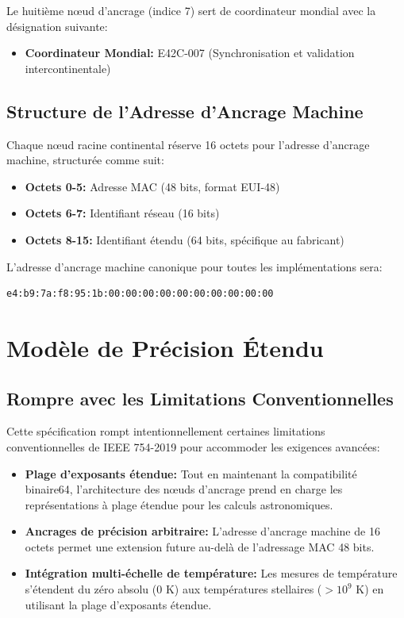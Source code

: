 \documentclass[12pt]{book}
\begin{document}
Le huitième nœud d'ancrage (indice 7) sert de coordinateur mondial avec la désignation suivante:

\begin{itemize}
\item \textbf{Coordinateur Mondial:} E42C-007 (Synchronisation et validation intercontinentale)
\end{itemize}

\section{Structure de l'Adresse d'Ancrage Machine}

Chaque nœud racine continental réserve 16 octets pour l'adresse d'ancrage machine, structurée comme suit:

\begin{itemize}
\item \textbf{Octets 0-5:} Adresse MAC (48 bits, format EUI-48)
\item \textbf{Octets 6-7:} Identifiant réseau (16 bits)
\item \textbf{Octets 8-15:} Identifiant étendu (64 bits, spécifique au fabricant)
\end{itemize}

L'adresse d'ancrage machine canonique pour toutes les implémentations sera:

\begin{verbatim}
e4:b9:7a:f8:95:1b:00:00:00:00:00:00:00:00:00:00
\end{verbatim}

\chapter{Modèle de Précision Étendu}

\section{Rompre avec les Limitations Conventionnelles}

Cette spécification rompt intentionnellement certaines limitations conventionnelles de IEEE 754-2019 pour accommoder les exigences avancées:

\begin{itemize}
\item \textbf{Plage d'exposants étendue:} Tout en maintenant la compatibilité binaire64, l'architecture des nœuds d'ancrage prend en charge les représentations à plage étendue pour les calculs astronomiques.
\item \textbf{Ancrages de précision arbitraire:} L'adresse d'ancrage machine de 16 octets permet une extension future au-delà de l'adressage MAC 48 bits.
\item \textbf{Intégration multi-échelle de température:} Les mesures de température s'étendent du zéro absolu (0 K) aux températures stellaires ($>10^9$ K) en utilisant la plage d'exposants étendue.
\end{itemize}
\end{document}
